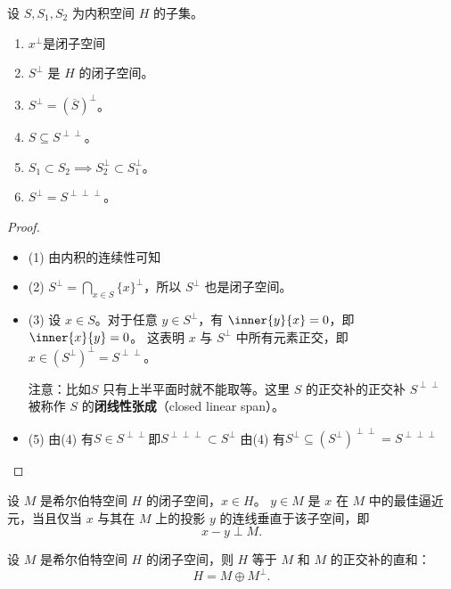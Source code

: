 \begin{theorem}
    设 \(S, S_1, S_2\) 为内积空间 \(H\) 的子集。
    \begin{enumerate}
        \item \(x^{\perp} \)是闭子空间
        \item \(S^\perp\) 是 \(H\) 的闭子空间。
        \item \(S^\perp = (\overline{S})^\perp\)。
        \item \(S \subseteq  S^{\perp\perp}\)。
        \item \(S_1 \subset S_2 \implies S_2^\perp \subset S_1^\perp\)。
        \item \(S^\perp = S^{\perp\perp\perp}\)。
    \end{enumerate}
\end{theorem}

\begin{proof}
    \begin{itemize}
        \item (1) 由内积的连续性可知
        \item (2)  \(S^\perp = \bigcap_{x
            \in S} \{x\}^\perp\)，所以 \(S^\perp\) 也是闭子空间。
        \item (3) 设 \(x \in S\)。对于任意 \(y \in S^\perp\)，有
            \(\inner{y}{x} = 0\)，即
            \(\inner{x}{y} = 0\)。
            这表明 \(x\) 与 \(S^\perp\) 中所有元素正交，即 \(x \in (S^\perp)^\perp =
            S^{\perp\perp}\)。

            注意：比如\(S\) 只有上半平面时就不能取等。这里 \(S\) 的正交补的正交补
            \(S^{\perp\perp}\) 被称作 \(S\)
            的\textbf{闭线性张成}（closed linear span）。
        \item (5) 由(4) 有\(S \in S^{\perp\perp}
            \)即\(S^{\perp \perp \perp }
            \subset  S^\perp\)
            由(4) 有\(S^{\perp } \subseteq (S^{\perp })^{\perp
                \perp } = S^{\perp
            \perp \perp } \)
    \end{itemize}
\end{proof}

\begin{theorem}
    设 \(M\) 是希尔伯特空间 \(H\) 的闭子空间，\(x \in H\)。
    \(y \in M\) 是 \(x\) 在 \(M\) 中的最佳逼近元，当且仅当 \(x\) 与其在 \(M\) 上的投影
    \(y\) 的连线垂直于该子空间，即
    \[
        x - y \perp M.
    \]
\end{theorem}

\begin{theorem}
    设 \(M\) 是希尔伯特空间 \(H\) 的闭子空间，则 \(H\) 等于 \(M\) 和 \(M\) 的正交补的直和：
    \[
        H = M \oplus M^\perp.
    \]
\end{theorem}

